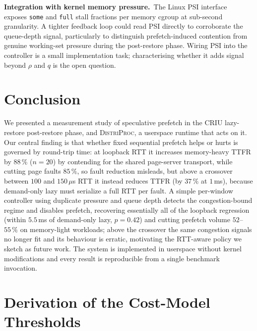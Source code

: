 \documentclass[journal]{IEEEtran}
\newcommand{\distriproc}{\textsc{DistriProc}\xspace}
\begin{document}
\textbf{Integration with kernel memory pressure.}\, The Linux PSI
interface~\cite{linux-psi} exposes \texttt{some} and \texttt{full} stall
fractions per memory cgroup at sub-second granularity. A tighter feedback
loop could read PSI directly to corroborate the queue-depth signal,
particularly to distinguish prefetch-induced contention from genuine
working-set pressure during the post-restore phase. Wiring PSI into the
controller is a small implementation task; characterising whether it
adds signal beyond $\rho$ and $q$ is the open question.

\section{Conclusion}
\label{sec:conclusion}

We presented a measurement study of speculative prefetch in the CRIU
lazy-restore post-restore phase, and \distriproc, a userspace runtime that
acts on it. Our central finding is that whether fixed sequential prefetch
helps or hurts is governed by round-trip time: at loopback RTT it increases
memory-heavy TTFR by $88\,\%$ ($n\!=\!20$) by contending for the shared
page-server transport, while cutting page faults $85\,\%$, so fault reduction
misleads, but above a crossover between $100$ and $150\,\mu$s RTT it instead
reduces TTFR (by $37\,\%$ at $1$\,ms), because demand-only lazy must
serialize a full RTT per fault. A simple per-window controller using
duplicate pressure and queue depth detects the congestion-bound regime and
disables prefetch, recovering essentially all of the loopback regression
(within $5.5$\,ms of demand-only lazy, $p\!=\!0.42$) and cutting prefetch
volume $52$--$55\,\%$ on memory-light workloads; above the crossover the same
congestion signals no longer fit and its behaviour is erratic, motivating the
RTT-aware policy we sketch as future work. The
system is implemented in userspace without kernel modifications and every
result is reproducible from a single benchmark invocation.

\appendices
\section{Derivation of the Cost-Model Thresholds}
\label{app:cost}
\end{document}
